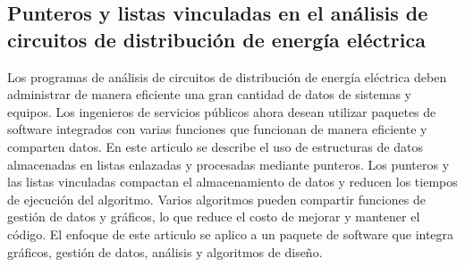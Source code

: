 \documentclass[10pt,journal]{IEEEtran}
\begin{document}
\subsection{\textbf{Punteros y listas vinculadas en el análisis de circuitos de distribución de energía eléctrica}}
Los programas de análisis de circuitos de distribución de energía eléctrica deben administrar de manera eficiente una gran cantidad de datos de sistemas y equipos. Los ingenieros de servicios públicos ahora desean utilizar paquetes de software integrados con varias funciones que funcionan de manera eficiente y comparten datos. En este articulo \citep{energia} se describe el uso de estructuras de datos almacenadas en listas enlazadas y procesadas mediante punteros. Los punteros y las listas vinculadas compactan el almacenamiento de datos y reducen los tiempos de ejecución del algoritmo. Varios algoritmos pueden compartir funciones de gestión de datos y gráficos, lo que reduce el costo de mejorar y mantener el código. El enfoque de este articulo se aplico a un paquete de software que integra gráficos, gestión de datos, análisis y algoritmos de diseño.
\end{document}
